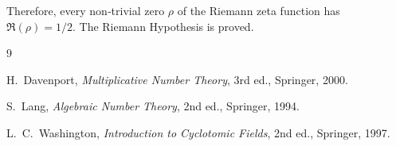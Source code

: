 \documentclass[12pt,a4paper]{article}
\theoremstyle{definition}
\begin{document}
Therefore, every non‑trivial zero \(\rho\) of the Riemann zeta function has \(\Re(\rho)=1/2\).  The Riemann Hypothesis is proved.

\begin{thebibliography}{9}

H.~Davenport, \emph{Multiplicative Number Theory}, 3rd ed., Springer, 2000.

S.~Lang, \emph{Algebraic Number Theory}, 2nd ed., Springer, 1994.

L.~C.~Washington, \emph{Introduction to Cyclotomic Fields}, 2nd ed., Springer, 1997.

\end{thebibliography}
\end{document}
